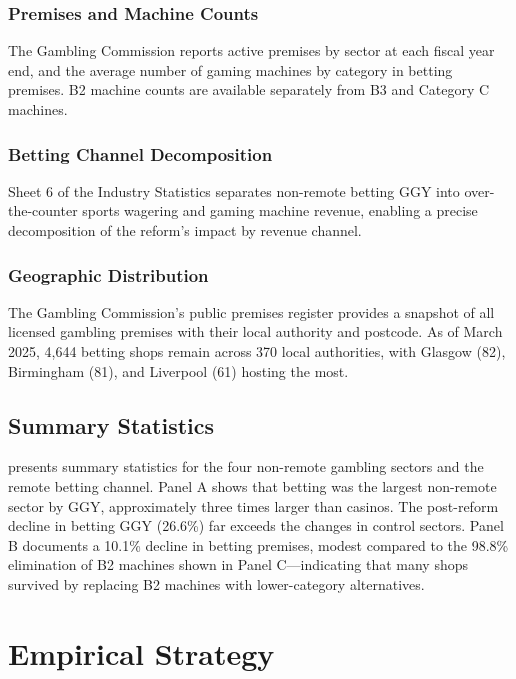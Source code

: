 \documentclass[12pt]{article}
\begin{document}
\subsubsection*{Premises and Machine Counts} The Gambling Commission reports active premises by sector at each fiscal year end, and the average number of gaming machines by category in betting premises. B2 machine counts are available separately from B3 and Category C machines.

\subsubsection*{Betting Channel Decomposition} Sheet 6 of the Industry Statistics separates non-remote betting GGY into over-the-counter sports wagering and gaming machine revenue, enabling a precise decomposition of the reform's impact by revenue channel.

\subsubsection*{Geographic Distribution} The Gambling Commission's public premises register provides a snapshot of all licensed gambling premises with their local authority and postcode. As of March 2025, 4,644 betting shops remain across 370 local authorities, with Glasgow (82), Birmingham (81), and Liverpool (61) hosting the most.

\subsection{Summary Statistics}



 presents summary statistics for the four non-remote gambling sectors and the remote betting channel. Panel A shows that betting was the largest non-remote sector by GGY, approximately three times larger than casinos. The post-reform decline in betting GGY (26.6\%) far exceeds the changes in control sectors. Panel B documents a 10.1\% decline in betting premises, modest compared to the 98.8\% elimination of B2 machines shown in Panel C---indicating that many shops survived by replacing B2 machines with lower-category alternatives.

\section{Empirical Strategy}
\end{document}
